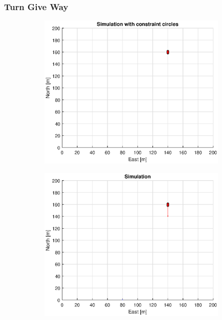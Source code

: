 \subsubsection{Turn Give Way}
\clearpage
\begin{figure}[!b] %
    \begin{subfigure}[b]{0.49\textwidth}
        \centering
        \includegraphics[width=\textwidth]{Images/Figures/sving_GW/Simple0_f1_Frame1}
    \end{subfigure}
    \hfill
    \begin{subfigure}[b]{0.499\textwidth}
        \centering
        \includegraphics[width=\textwidth]{Images/Figures/sving_GW/Simple0_f600_Frame1}

\end{subfigure}
\end{figure}
